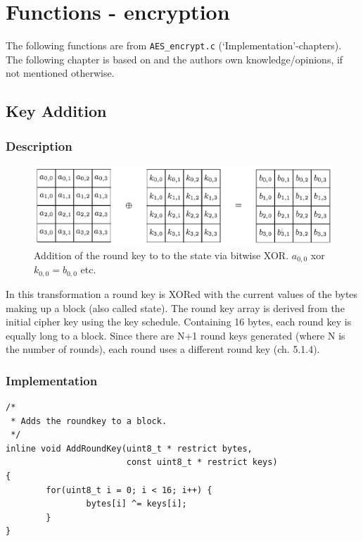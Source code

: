 \hypertarget{functions---Encryption}{%
\chapter{Functions - encryption}\label{functions---encryption}}

The following functions are from \lstinline|AES_encrypt.c|
(`Implementation'-chapters). The following chapter is based on \cite{aes2001} and the authors own
knowledge/opinions, if not mentioned otherwise.

\hypertarget{key-addition}{%
\section{Key Addition}\label{key-addition}}

\hypertarget{description-2}{%
\subsection{Description}\label{description-2}}

\begin{figure}
\centering
\includegraphics[scale = 0.3]{data/figures/addroundkey.png}
\caption{Addition of the round key to to the state via bitwise XOR. $a_{0,0}$ xor $k_{0,0} = b_{0,0}$ etc. \cite[p. 41]{rijndael}}
\end{figure}

In this transformation a round key is
XORed with the current values of the bytes making up a block (also called state). The round key array is
derived from the initial cipher key using the key schedule. Containing
16 bytes, each round key is equally long to a block. Since there are N+1
round keys generated (where N is the number of rounds), each round uses
a different round key (ch. 5.1.4).

\hypertarget{implementation-2}{%
\subsection{Implementation}\label{implementation-2}}

\begin{lstlisting}
/*
 * Adds the roundkey to a block.
 */
inline void AddRoundKey(uint8_t * restrict bytes,
                        const uint8_t * restrict keys)
{
        for(uint8_t i = 0; i < 16; i++) {
                bytes[i] ^= keys[i];
        }
}
\end{lstlisting}

